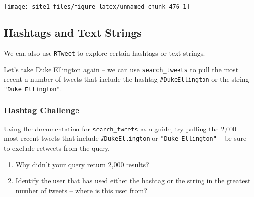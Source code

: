 \documentclass[]{book}
\begin{document}
\begin{center}\texttt{[image: site1\_files/figure-latex/unnamed-chunk-476-1]} \end{center}

\hypertarget{hashtags-and-text-strings}{%
\subsection{Hashtags and Text Strings}\label{hashtags-and-text-strings}}

We can also use \texttt{RTweet} to explore certain hashtags or text strings.

Let's take Duke Ellington again -- we can use \texttt{search\_tweets} to pull the most recent n number of tweets that include the hashtag \texttt{\#DukeEllington} or the string \texttt{"Duke\ Ellington"}.

\hypertarget{hashtag-challenge}{%
\subsubsection*{Hashtag Challenge}\label{hashtag-challenge}}

Using the documentation for \texttt{search\_tweets} as a guide, try pulling the 2,000 most recent tweets that include \texttt{\#DukeEllington} or \texttt{"Duke\ Ellington"} -- be sure to exclude retweets from the query.

\begin{enumerate}
\def\labelenumi{\arabic{enumi}.}
\item
  Why didn't your query return 2,000 results?
\item
  Identify the user that has used either the hashtag or the string in the greatest number of tweets -- where is this user from?
\end{enumerate}
\end{document}
